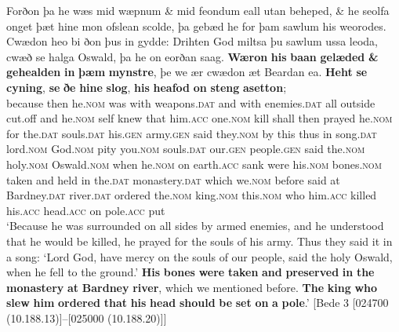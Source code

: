 \documentclass[output=paper,colorlinks,citecolor=brown]{langscibook}
\begin{document}
\gll Forðon     þa   he     wæs   mid   wæpnum   \& mid
feondum   eall   utan   beheped,  \& he     seolfa  
onget   þæt   hine     mon      ofslean    scolde,   þa   gebæd
he     for   þam     sawlum   his     weorodes. Cwædon   heo     bi   ðon   þus   in   gydde:     Drihten
God     miltsa   þu     sawlum   ussa     leoda, 
cwæð   se     halga     Oswald,    þa   he     on
eorðan     saag.   \textbf{Wæron}   \textbf{his}    \textbf{baan}     \textbf{gelæded}   \textbf{\&}
\textbf{gehealden}   \textbf{in}   \textbf{þæm}     \textbf{mynstre},     þe   we
ær   cwædon   æt   Beardan   ea.     \textbf{Heht}  \textbf{se}
\textbf{cyning},    \textbf{se}     \textbf{ðe}   \textbf{hine}     \textbf{slog},   \textbf{his}   \textbf{heafod}     \textbf{on}
\textbf{steng}     \textbf{asetton};\\
because    then  he.\textsc{nom}  was  with  weapons.\textsc{dat}   and  with
enemies.\textsc{dat}  all  outside  cut.off    and  he.\textsc{nom}  self
knew  that  him.\textsc{acc}  one.\textsc{nom}   kill  shall     then  prayed
he.\textsc{nom}  for  the.\textsc{dat}  souls.\textsc{dat}  his.\textsc{gen}   army.\textsc{gen} said    they.\textsc{nom}  by  this  thus  in  song.\textsc{dat}  lord.\textsc{nom}
God.\textsc{nom}  pity  you.\textsc{nom}  souls.\textsc{dat}  our.\textsc{gen}  people.\textsc{gen}
said  the.\textsc{nom}  holy.\textsc{nom}  Oswald.\textsc{nom}   when  he.\textsc{nom}  on
earth.\textsc{acc}  sank  were    his.\textsc{nom}  bones.\textsc{nom}  taken    and
held    in  the.\textsc{dat}  monastery.\textsc{dat}    which  we.\textsc{nom}
before  said    at   Bardney.\textsc{dat}  river.\textsc{dat}   ordered  the.\textsc{nom}
king.\textsc{nom}  this.\textsc{nom}  who  him.\textsc{acc}  killed  his.\textsc{acc} head.\textsc{acc}  on
pole.\textsc{acc}  put\\
\glt ‘Because he was surrounded on all sides by armed enemies, and he understood that he would be killed, he prayed for the souls of his army. Thus they said it in a song: ‘Lord God, have mercy on the souls of our people, said the holy Oswald, when he fell to the ground.' \textbf{His} \textbf{bones} \textbf{were} \textbf{taken} \textbf{and} \textbf{preserved} \textbf{in} \textbf{the} \textbf{monastery} \textbf{at} \textbf{Bardney} \textbf{river}, which we mentioned before. \textbf{The} \textbf{king} \textbf{who} \textbf{slew} \textbf{him} \textbf{ordered} \textbf{that} \textbf{his} \textbf{head} \textbf{should} \textbf{be} \textbf{set} \textbf{on} \textbf{a} \textbf{pole}.' \hfill [Bede 3 [024700 (10.188.13)]--[025000 (10.188.20)]]
\z 
\end{document}
